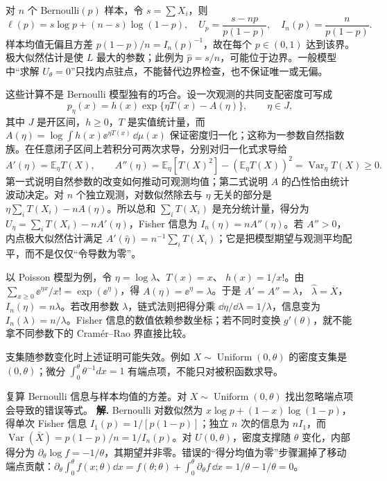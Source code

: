 对 \(n\) 个 Bernoulli\((p)\) 样本，令 \(s=\sum X_i\)，则
\[
\ell(p)=s\log p+(n-s)\log(1-p),\quad
U_p=\frac{s-np}{p(1-p)},\quad
I_n(p)=\frac{n}{p(1-p)}.
\]
样本均值无偏且方差 \(p(1-p)/n=I_n(p)^{-1}\)，故在每个 \(p\in(0,1)\) 达到该界。极大似然估计是使 \(L\) 最大的参数；此例为 \(\widehat p=s/n\)，可能位于边界。一般模型中“求解 \(U_\theta=0\)”只找内点驻点，不能替代边界检查，也不保证唯一或无偏。

这些计算不是 Bernoulli 模型独有的巧合。设一次观测的共同支配密度可写成
\[
p_\eta(x)=h(x)\exp\{\eta T(x)-A(\eta)\},
\qquad \eta\in J,
\]
其中 \(J\) 是开区间，\(h\ge0\)，\(T\) 是实值统计量，而
\(A(\eta)=\log\int h(x)\ee^{\eta T(x)}\,\dd\mu(x)\)
保证密度归一化；这称为一参数自然指数族。在任意闭子区间上若积分可两次求导，分别对归一化式求导给
\[
A'(\eta)=\mathbb E_\eta T(X),\qquad
A''(\eta)=\mathbb E_\eta[T(X)^2]-(\mathbb E_\eta T(X))^2
=\operatorname{Var}_\eta T(X)\ge0.
\]
第一式说明自然参数的改变如何推动可观测均值；第二式说明 \(A\) 的凸性恰由统计波动决定。对 \(n\) 个独立观测，对数似然除去与 \(\eta\) 无关的部分是
\(\eta\sum_iT(X_i)-nA(\eta)\)。所以总和 \(\sum_iT(X_i)\) 是充分统计量，得分为
\(U_\eta=\sum_iT(X_i)-nA'(\eta)\)，Fisher 信息为
\(I_n(\eta)=nA''(\eta)\)。若 \(A''>0\)，内点极大似然估计满足
\(A'(\widehat\eta)=n^{-1}\sum_iT(X_i)\)；它是把模型期望与观测平均配平，而不是仅仅“令导数为零”。

以 Poisson 模型为例，令 \(\eta=\log\lambda\)、\(T(x)=x\)、
\(h(x)=1/x!\)。由 \(\sum_{x\ge0}\ee^{\eta x}/x!=\exp(\ee^\eta)\)，得
\(A(\eta)=\ee^\eta=\lambda\)。于是 \(A'=A''=\lambda\)，
\(\widehat\lambda=\overline X\)，\(I_n(\eta)=n\lambda\)。若改用参数 \(\lambda\)，链式法则把得分乘 \(\dd\eta/\dd\lambda=1/\lambda\)，信息变为
\(I_n(\lambda)=n/\lambda\)。Fisher 信息的数值依赖参数坐标；若不同时变换 \(g'(\theta)\)，就不能拿不同参数下的 Cramér--Rao 界直接比较。

支集随参数变化时上述证明可能失效。例如 \(X\sim\operatorname{Uniform}(0,\theta)\) 的密度支集是 \((0,\theta)\)；微分 \(\int_0^\theta\theta^{-1}dx=1\) 有端点项，不能只对被积函数求导。



\par
\begin{workedexample}
复算 Bernoulli 信息与样本均值的方差。对 \(X\sim\operatorname{Uniform}(0,\theta)\) 找出忽略端点项会导致的错误等式。
\textbf{解.} Bernoulli 对数似然为 \(x\log p+(1-x)\log(1-p)\)，得单次 Fisher 信息 \(I_1(p)=1/[p(1-p)]\)；独立 \(n\) 次的信息为 \(nI_1\)，而 \(\operatorname{Var}(\bar X)=p(1-p)/n=1/I_n(p)\)。对 \(U(0,\theta)\)，密度支撑随 \(\theta\) 变化，内部得分为 \(\partial_\theta\log f=-1/\theta\)，其期望并非零。错误的“得分均值为零”步骤漏掉了移动端点贡献：\(\partial_\theta\int_0^\theta f(x;\theta)\dd x=f(\theta;\theta)+\int_0^\theta\partial_\theta f\,\dd x=1/\theta-1/\theta=0\)。
\end{workedexample}
\par
